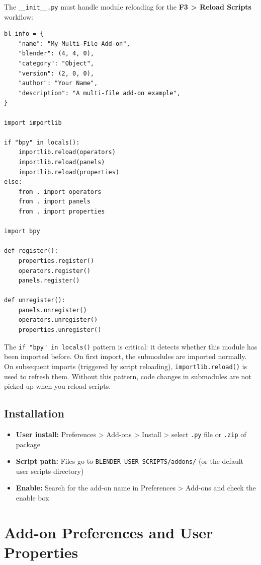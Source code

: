 The \texttt{\_\_init\_\_.py} must handle module reloading for the \textbf{F3 > Reload Scripts} workflow:

\begin{lstlisting}
bl_info = {
    "name": "My Multi-File Add-on",
    "blender": (4, 4, 0),
    "category": "Object",
    "version": (2, 0, 0),
    "author": "Your Name",
    "description": "A multi-file add-on example",
}

import importlib

if "bpy" in locals():
    importlib.reload(operators)
    importlib.reload(panels)
    importlib.reload(properties)
else:
    from . import operators
    from . import panels
    from . import properties

import bpy

def register():
    properties.register()
    operators.register()
    panels.register()

def unregister():
    panels.unregister()
    operators.unregister()
    properties.unregister()
\end{lstlisting}

The \texttt{if "bpy" in locals()} pattern is critical: it detects whether this module has been imported before. On first import, the submodules are imported normally. On subsequent imports (triggered by script reloading), \texttt{importlib.reload()} is used to refresh them. Without this pattern, code changes in submodules are not picked up when you reload scripts.

\subsection{Installation}

\begin{itemize}[leftmargin=2em]
  \item \textbf{User install:} Preferences > Add-ons > Install > select \texttt{.py} file or \texttt{.zip} of package
  \item \textbf{Script path:} Files go to \texttt{BLENDER\_USER\_SCRIPTS/addons/} (or the default user scripts directory)
  \item \textbf{Enable:} Search for the add-on name in Preferences > Add-ons and check the enable box
\end{itemize}


\section{Add-on Preferences and User Properties}
\label{sec:scripting-preferences}

